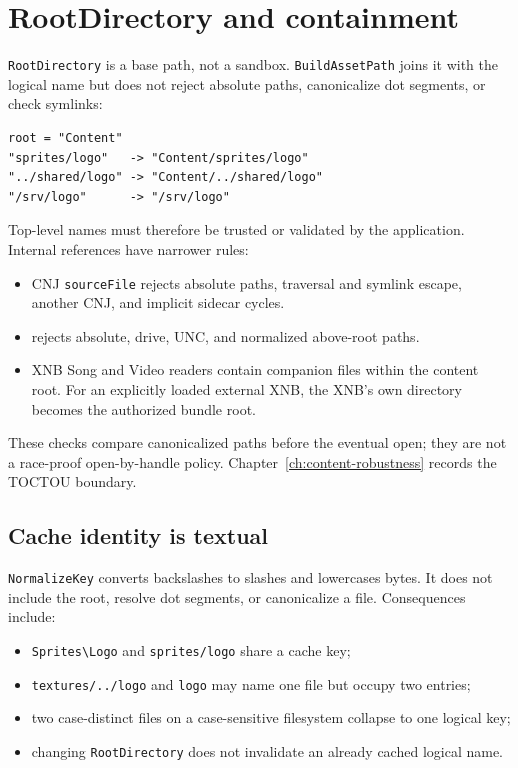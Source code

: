 \section{RootDirectory and containment}

\texttt{RootDirectory} is a base path, not a sandbox. \texttt{BuildAssetPath} joins it with the
logical name but does not reject absolute paths, canonicalize dot segments, or check symlinks:

\begin{lstlisting}
root = "Content"
"sprites/logo"   -> "Content/sprites/logo"
"../shared/logo" -> "Content/../shared/logo"
"/srv/logo"      -> "/srv/logo"
\end{lstlisting}

Top-level names must therefore be trusted or validated by the application. Internal references
have narrower rules:

\begin{itemize}
  \item CNJ \texttt{sourceFile} rejects absolute paths, traversal and symlink escape, another
        CNJ, and implicit sidecar cycles.
  \item {} rejects absolute, drive, UNC, and
        normalized above-root paths.
  \item XNB Song and Video readers contain companion files within the content root. For an
        explicitly loaded external XNB, the XNB's own directory becomes the authorized bundle
        root.
\end{itemize}

These checks compare canonicalized paths before the eventual open; they are not a race-proof
open-by-handle policy. Chapter~\ref{ch:content-robustness} records the TOCTOU boundary.

\subsection{Cache identity is textual}

\texttt{NormalizeKey} converts backslashes to slashes and lowercases bytes. It does not include
the root, resolve dot segments, or canonicalize a file. Consequences include:

\begin{itemize}
  \item \texttt{Sprites\textbackslash Logo} and \texttt{sprites/logo} share a cache key;
  \item \texttt{textures/../logo} and \texttt{logo} may name one file but occupy two entries;
  \item two case-distinct files on a case-sensitive filesystem collapse to one logical key;
  \item changing \texttt{RootDirectory} does not invalidate an already cached logical name.
\end{itemize}

